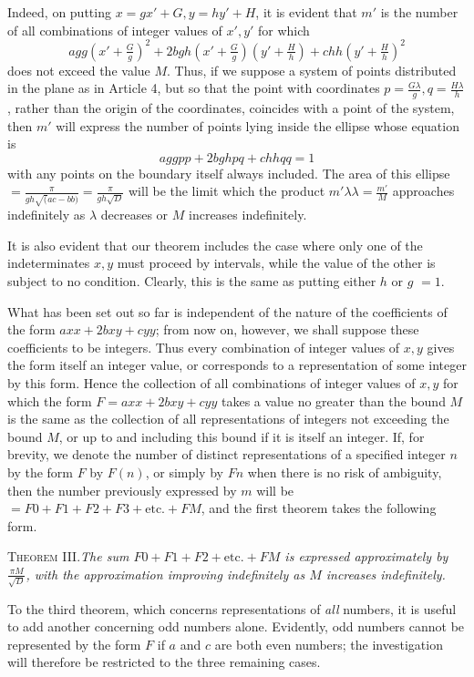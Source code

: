 Indeed, on putting $x=gx'+G,y=hy'+H$, it is evident that $m'$ is the number of all combinations of integer values of $x',y'$ for which
\begingroup{}
\[
agg(x'+\tfrac Gg)^2+2bgh(x'+\tfrac Gg)(y'+\tfrac Hh)+chh(y'+\tfrac Hh)^2
\]
does not exceed the value $M$.
\endgroup
Thus, if we suppose a system of points distributed in the plane as in Article 4, but so that the point with coordinates $p=\frac{G\lambda}g,q=\frac{H\lambda}h$, rather than the origin of the coordinates, coincides with a point of the system, then $m'$ will express the number of points lying inside the
ellipse whose equation is
\begingroup{}
\[
aggpp+2bghpq+chhqq=1
\]
with any points on the boundary itself always included.
\endgroup The area of this ellipse $=\frac\pi{gh\surd(ac-bb)}=\frac\pi{gh\surd D}$ will be the limit which the product $m'\lambda\lambda=\frac{m'}M$ approaches indefinitely as $\lambda$ decreases or $M$ increases indefinitely.

It is also evident that our theorem includes the case where only one of the indeterminates $x,y$ must proceed by intervals, while the value of the other is subject to no condition. Clearly, this is the same as putting either $h$ or $g$ $=1$.

What has been set out so far is independent of the nature of the coefficients of the form $axx+2bxy+cyy$; from now on, however, we shall suppose these coefficients to be integers. Thus every combination of integer values of $x,y$ gives the form itself an integer value, or corresponds to a representation of some integer by this form. Hence the collection of all combinations of integer values of $x,y$ for which the form $F=axx+2bxy+cyy$ takes a value no greater than the bound $M$ is the same as the collection of all representations of integers not exceeding the bound $M$, or up to and including this bound if it is itself an integer. If, for brevity, we denote the number of distinct representations of a specified integer $n$ by the form $F$ by $F(n)$, or simply by $Fn$ when there is no risk of ambiguity, then the number previously expressed by $m$ will be $=F0+F1+F2+F3+\text{etc.}+FM$, and the first theorem takes the following form.

\textsc{Theorem III.}\quad\emph{The sum $F0+F1+F2+\text{etc.}+FM$ is expressed approximately by $\frac{\pi M}{\surd D}$, with the approximation improving indefinitely as $M$ increases indefinitely.}

To the third theorem, which concerns representations of \emph{all} numbers, it is useful to add another concerning odd numbers alone. Evidently, odd numbers cannot be represented by the form $F$ if $a$ and $c$ are both even numbers; the investigation will therefore be restricted to the three remaining cases.

